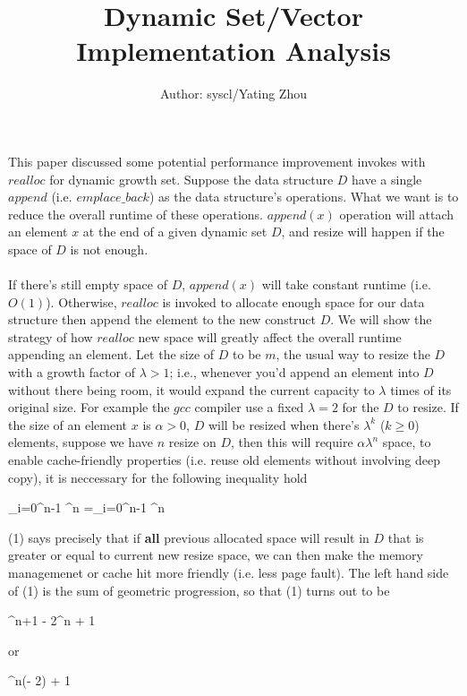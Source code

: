 \documentclass[10pt]{article}
\begin{document}
	\title{%
		\textbf{Dynamic Set/Vector Implementation Analysis}} 
		\author{
			Author: syscl/Yating Zhou\\ 
		}
	\maketitle
		This paper discussed some potential performance improvement invokes with $realloc$ for dynamic growth set. Suppose the data structure $D$ have a single $append$ (i.e. $emplace\_back$) as the data structure's operations. What we want is to reduce the overall runtime of these operations. $append(x)$ operation will attach an element $x$ at the end of a given dynamic set $D$, and resize will happen if the space of $D$ is not enough. \\\\
		If there's still empty space of $D$, $append(x)$ will take constant runtime (i.e. $O(1)$). Otherwise, $realloc$ is invoked to allocate enough space for our data structure then append the element to the new construct $D$. We will show the strategy of how $realloc$ new space will greatly affect the overall runtime appending an element. Let the size of $D$ to be $m$, the usual way to resize the $D$ with a growth factor of  $\lambda > 1$; i.e., whenever you'd append an element into $D$ without there being room, it would expand the current capacity to $\lambda$ times of its original size. For example the $gcc$ compiler use a fixed $\lambda = 2$ for the $D$ to resize. If the size of an element $x$ is $\alpha > 0$, $D$ will be resized when there's $\lambda^k$ ($k\geq 0$) elements, suppose we have $n$ resize on $D$, then this will require $\alpha \lambda ^ n$ space,  to enable cache-friendly properties (i.e. reuse old elements without involving deep copy), it is neccessary for the following inequality hold
		\begin{flalign}
			\sum\limits_{i=0}^{n-1} \alpha \lambda^{n} =\alpha \sum\limits_{i=0}^{n-1} \lambda \geq \alpha\lambda^{n}
		\end{flalign}
		(1) says precisely that if \textbf{all} previous allocated space will result in $D$ that is greater or equal to current new resize space, we can then make the memory managemenet or cache hit more friendly (i.e. less page fault). 
		The left hand side of (1) is the sum of geometric progression, so that (1) turns out to be 
		\begin{flalign}
			\lambda^{n+1} - 2\lambda^{n} + 1 \leq 0
		\end{flalign}
		or 
		\begin{flalign}
			\lambda^{n}(\lambda - 2) + 1 \leq 0
		\end{flalign}
\end{document}
